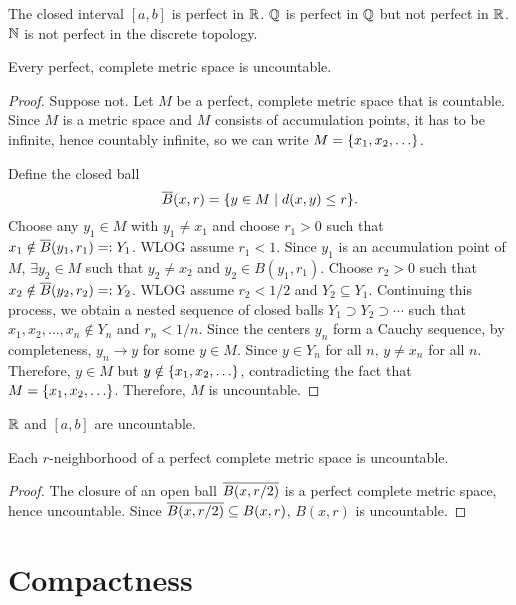 \begin{ex}
    The closed interval $[a, b]$ is perfect in $\R$. $\Q$ is perfect in $\Q$ but not perfect in $\R$. $\N$ is not perfect in the discrete topology.
\end{ex}

\begin{thm}
    Every perfect, complete metric space is uncountable.
    \begin{proof}
        Suppose not. Let $M$ be a perfect, complete metric space that is countable. Since $M$ is a metric space and $M$ consists of accumulation points, it has to be infinite, hence countably infinite, so we can write $M = \set{x_1, x_2, \ldots}$.

        Define the closed ball
        \[
        \Bar B(x, r) = \set{y \in M \mid d(x, y) \leq r}.
        \]
        Choose any $y_1 \in M$ with $y_1 \neq x_1$ and choose $r_1 > 0$ such that $x_1 \notin \Bar B(y_1, r_1) =: Y_1$. WLOG assume $r_1 < 1$. Since $y_1$ is an accumulation point of $M$, $\exists y_2 \in M$ such that $y_2 \neq x_2$ and $y_2 \in B(y_1, r_1)$. Choose $r_2 > 0$ such that $x_2 \notin \Bar B(y_2, r_2) =: Y_2$. WLOG assume $r_2 < 1/2$ and $Y_2 \subseteq Y_1$. Continuing this process, we obtain a nested sequence of closed balls $Y_1 \supset Y_2 \supset \cdots$ such that $x_1, x_2, \ldots, x_n \notin Y_n$ and $r_n < 1/n$. Since the centers $y_n$ form a Cauchy sequence, by completeness, $y_n \to y$ for some $y \in M$. Since $y \in Y_n$ for all $n$, $y \neq x_n$ for all $n$. Therefore, $y \in M$ but $y \notin \set{x_1, x_2, \ldots}$, contradicting the fact that $M = \set{x_1, x_2, \ldots}$. Therefore, $M$ is uncountable.
    \end{proof}
\end{thm}

\begin{cl}
    $\R$ and $[a, b]$ are uncountable.
\end{cl}

\begin{cl}
    Each $r$-neighborhood of a perfect complete metric space is uncountable.
    \begin{proof}
        The closure of an open ball $\Bar{B(x, r/2)}$ is a perfect complete metric space, hence uncountable. Since $\Bar{B(x, r/2)} \subseteq B(x, r)$, $B(x, r)$ is uncountable.
    \end{proof}
\end{cl}

\chapter{Compactness}

